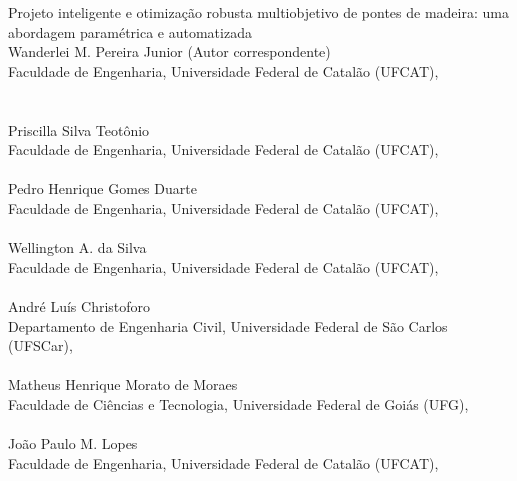 \begin{center}
{\Huge Projeto inteligente e otimização robusta multiobjetivo de pontes de madeira: uma abordagem paramétrica e automatizada}
\\[5ex]

{\large Wanderlei M. Pereira Junior \small(Autor correspondente)} \\
{\small
Faculdade de Engenharia, Universidade Federal de Catalão (UFCAT),  \\
 \\
} \\[1.2em]

{\large Priscilla Silva Teotônio} \\
{\small
Faculdade de Engenharia, Universidade Federal de Catalão (UFCAT),  \\
} \\[1.2em]

{\large Pedro Henrique Gomes Duarte} \\
{\small
Faculdade de Engenharia, Universidade Federal de Catalão (UFCAT),  \\
} \\[1.2em]

{\large Wellington A. da Silva} \\
{\small
Faculdade de Engenharia, Universidade Federal de Catalão (UFCAT),  \\
} \\[1.2em]

{\large André Luís Christoforo} \\
{\small
Departamento de Engenharia Civil, Universidade Federal de São Carlos (UFSCar),  \\
} \\[1.2em]

{\large Matheus Henrique Morato de Moraes} \\
{\small
Faculdade de Ciências e Tecnologia, Universidade Federal de Goiás (UFG),  \\
} \\[1.2em]

{\large João Paulo M. Lopes} \\
{\small
Faculdade de Engenharia, Universidade Federal de Catalão (UFCAT),  \\
} \\[1.2em]


\end{center}
